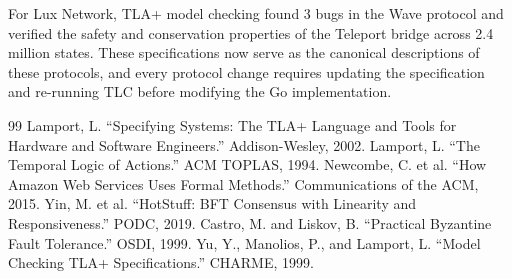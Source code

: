 \documentclass[11pt,a4paper]{article}
\begin{document}
For Lux Network, TLA+ model checking found 3 bugs in the Wave protocol and verified
the safety and conservation properties of the Teleport bridge across 2.4 million states.
These specifications now serve as the canonical descriptions of these protocols, and
every protocol change requires updating the specification and re-running TLC before
modifying the Go implementation.

\begin{thebibliography}{99}
 Lamport, L. ``Specifying Systems: The TLA+ Language and Tools for Hardware and Software Engineers.'' Addison-Wesley, 2002.
 Lamport, L. ``The Temporal Logic of Actions.'' ACM TOPLAS, 1994.
 Newcombe, C. et al. ``How Amazon Web Services Uses Formal Methods.'' Communications of the ACM, 2015.
 Yin, M. et al. ``HotStuff: BFT Consensus with Linearity and Responsiveness.'' PODC, 2019.
 Castro, M. and Liskov, B. ``Practical Byzantine Fault Tolerance.'' OSDI, 1999.
 Yu, Y., Manolios, P., and Lamport, L. ``Model Checking TLA+ Specifications.'' CHARME, 1999.
\end{thebibliography}
\end{document}
